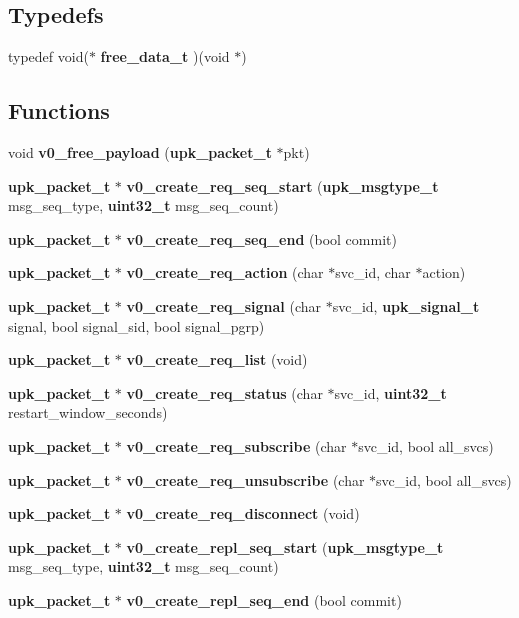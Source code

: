 \subsection*{Typedefs}
\begin{DoxyCompactItemize}
\item 
typedef void($\ast$ {\bf free\_\-data\_\-t} )(void $\ast$)
\end{DoxyCompactItemize}
\subsection*{Functions}
\begin{DoxyCompactItemize}
\item 
void {\bf v0\_\-free\_\-payload} ({\bf upk\_\-packet\_\-t} $\ast$pkt)
\item 
{\bf upk\_\-packet\_\-t} $\ast$ {\bf v0\_\-create\_\-req\_\-seq\_\-start} ({\bf upk\_\-msgtype\_\-t} msg\_\-seq\_\-type, {\bf uint32\_\-t} msg\_\-seq\_\-count)
\item 
{\bf upk\_\-packet\_\-t} $\ast$ {\bf v0\_\-create\_\-req\_\-seq\_\-end} (bool commit)
\item 
{\bf upk\_\-packet\_\-t} $\ast$ {\bf v0\_\-create\_\-req\_\-action} (char $\ast$svc\_\-id, char $\ast$action)
\item 
{\bf upk\_\-packet\_\-t} $\ast$ {\bf v0\_\-create\_\-req\_\-signal} (char $\ast$svc\_\-id, {\bf upk\_\-signal\_\-t} signal, bool signal\_\-sid, bool signal\_\-pgrp)
\item 
{\bf upk\_\-packet\_\-t} $\ast$ {\bf v0\_\-create\_\-req\_\-list} (void)
\item 
{\bf upk\_\-packet\_\-t} $\ast$ {\bf v0\_\-create\_\-req\_\-status} (char $\ast$svc\_\-id, {\bf uint32\_\-t} restart\_\-window\_\-seconds)
\item 
{\bf upk\_\-packet\_\-t} $\ast$ {\bf v0\_\-create\_\-req\_\-subscribe} (char $\ast$svc\_\-id, bool all\_\-svcs)
\item 
{\bf upk\_\-packet\_\-t} $\ast$ {\bf v0\_\-create\_\-req\_\-unsubscribe} (char $\ast$svc\_\-id, bool all\_\-svcs)
\item 
{\bf upk\_\-packet\_\-t} $\ast$ {\bf v0\_\-create\_\-req\_\-disconnect} (void)
\item 
{\bf upk\_\-packet\_\-t} $\ast$ {\bf v0\_\-create\_\-repl\_\-seq\_\-start} ({\bf upk\_\-msgtype\_\-t} msg\_\-seq\_\-type, {\bf uint32\_\-t} msg\_\-seq\_\-count)
\item 
{\bf upk\_\-packet\_\-t} $\ast$ {\bf v0\_\-create\_\-repl\_\-seq\_\-end} (bool commit)
\item 

\end{DoxyCompactItemize}
